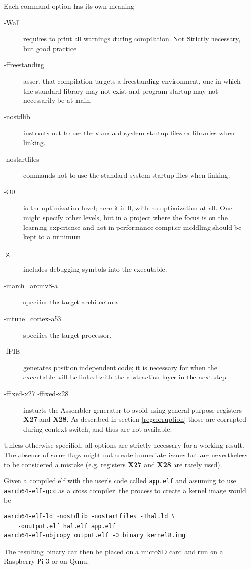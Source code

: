 \documentclass[12pt,a4paper,openright,twoside]{report}
\begin{document}
Each command option has its own meaning:
\begin{description}
    \item[-Wall] requires to print all warnings during compilation. Not Strictly
        necessary, but good practice.
    \item[-ffreestanding] assert that compilation targets a freestanding 
        environment, one in which the standard library may not exist and program 
        startup may not necessarily be at main.
    \item[-nostdlib] instructs not to use the standard system startup files or 
        libraries when linking.
    \item[-nostartfiles] commands not to use the standard system startup 
        files when linking.
    \item[-O0] is the optimization level; here it is 0, with no optimization at all.
        One might specify other levels, but in a project where the focus is on 
        the learning experience and not in performance compiler meddling should 
        be kept to a minimum
    \item[-g] includes debugging symbols into the executable.
    \item[-march=aromv8-a] specifies the target architecture.
    \item[-mtune=cortex-a53] specifies the target processor.
    \item[-fPIE] generates position independent code; it is necessary for when
        the executable will be linked with the abstraction layer in the next step.
    \item[-ffixed-x27 -ffixed-x28] instucts the Assembler generator to avoid using
        general purpose registers \textbf{X27} and \textbf{X28}. 
        As described in section \ref{regcorruption}
        those are corrupted during context switch, and thus are not available.
\end{description}

Unless otherwise specified, all options are strictly necessary for a working 
result. The absence of some flags might not create immediate issues but are 
nevertheless to be considered a mistake (e.g. registers \textbf{X27} and \textbf{X28}
are rarely used).

Given a compiled elf with the user's code called {\tt app.elf} and assuming to
use {\tt aarch64-elf-gcc} as a cross compiler, the process to create a kernel image
would be 
\begin{lstlisting}
aarch64-elf-ld -nostdlib -nostartfiles -Thal.ld \
    -ooutput.elf hal.elf app.elf                                                                                                                                    
aarch64-elf-objcopy output.elf -O binary kernel8.img
\end{lstlisting}
The resulting binary can then be placed on a microSD card and run on a Raspberry Pi 3
or on Qemu.
\end{document}
